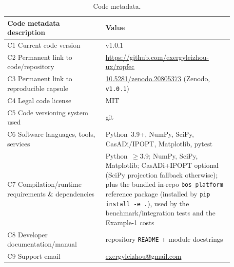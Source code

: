 \documentclass[11pt]{article}
\newcommand{\code}[1]{\texttt{#1}}
\begin{document}
\begin{table}[h]
\centering
\small
\caption{Code metadata.}
\label{tab:meta}
\renewcommand{\arraystretch}{1.15}
\begin{tabular}{>{\raggedright\arraybackslash}p{0.40\linewidth} >{\raggedright\arraybackslash}p{0.52\linewidth}}
\toprule
\textbf{Code metadata description} & \textbf{Value} \\
\midrule
C1 Current code version & v1.0.1 \\
C2 Permanent link to code/repository & \url{https://github.com/exergyleizhou-ux/ropfec} \\
C3 Permanent link to reproducible capsule & \href{https://doi.org/10.5281/zenodo.20805373}{10.5281/zenodo.20805373} (Zenodo, \texttt{v1.0.1}) \\
C4 Legal code license & MIT \\
C5 Code versioning system used & git \\
C6 Software languages, tools, services & Python~3.9+, NumPy, SciPy, CasADi/IPOPT, Matplotlib, pytest \\
C7 Compilation/runtime requirements \& dependencies & Python~$\ge$3.9; NumPy, SciPy, Matplotlib; CasADi+IPOPT optional (SciPy projection fallback otherwise); plus the bundled in-repo \code{bos\_platform} reference package (installed by \code{pip install -e .}), used by the benchmark/integration tests and the Example-1 costs \\
C8 Developer documentation/manual & repository \code{README} + module docstrings \\
C9 Support email & \href{mailto:exergyleizhou@gmail.com}{exergyleizhou@gmail.com} \\
\bottomrule
\end{tabular}
\end{table}

\end{document}
